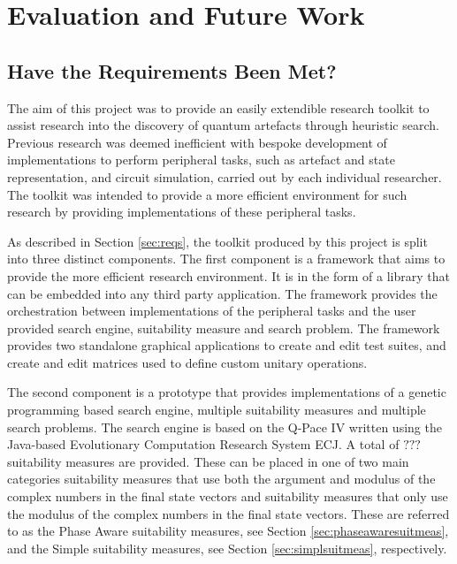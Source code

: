 \chapter{Evaluation and Future Work}
\label{sec:evalandfutwork}

\section{Have the Requirements Been Met?}

The aim of this project was to provide an easily extendible research toolkit to assist research into the discovery of quantum artefacts through heuristic search.
Previous research was deemed inefficient with bespoke development of implementations to perform peripheral tasks, such as artefact and state representation, and circuit simulation, carried out by each individual researcher.
The toolkit was intended to provide a more efficient environment for such research by providing implementations of these peripheral tasks.

As described in Section \ref{sec:reqs}, the toolkit produced by this project is split into three distinct components.
The first component is a framework that aims to provide the more efficient research environment.
It is in the form of a library that can be embedded into any third party application.
The framework provides the orchestration between implementations of the peripheral tasks and the user provided search engine, suitability measure and search problem.
The framework provides two standalone graphical applications to create and edit test suites, and create and edit matrices used to define custom unitary operations.

The second component is a prototype that provides implementations of a genetic programming based search engine, multiple suitability measures and multiple search problems.
The search engine is based on the Q-Pace IV\cite{masseythesis} written using the Java-based Evolutionary Computation Research System ECJ\cite{ecjtool}.
A total of $???$ suitability measures are provided.
These can be placed in one of two main categories suitability measures that use both the argument and modulus of the complex numbers in the final state vectors and suitability measures that only use the modulus of the complex numbers in the final state vectors.
These are referred to as the Phase Aware suitability measures, see Section \ref{sec:phaseawaresuitmeas}, and the Simple suitability measures, see Section \ref{sec:simplsuitmeas}, respectively.

